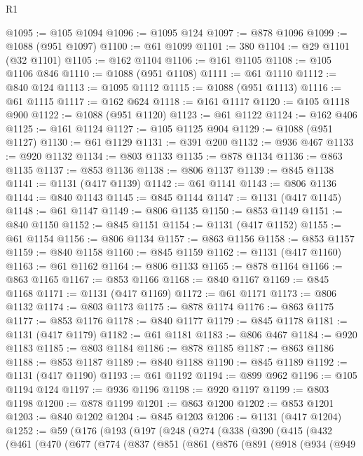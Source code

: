 \begin{lexlean}{R1}
\begin{coremodule}
@1095 := @105 @1094
@1096 := @1095 @124
@1097 := @878 @1096
@1099 := @1088 (@951 @1097)
@1100 := @61 @1099
@1101 := 380
@1104 := @29 @1101 (@32 @1101)
@1105 := @162 @1104
@1106 := @161 @1105
@1108 := @105 @1106 @846
@1110 := @1088 (@951 @1108)
@1111 := @61 @1110
@1112 := @840 @124
@1113 := @1095 @1112
@1115 := @1088 (@951 @1113)
@1116 := @61 @1115
@1117 := @162 @624
@1118 := @161 @1117
@1120 := @105 @1118 @900
@1122 := @1088 (@951 @1120)
@1123 := @61 @1122
@1124 := @162 @406
@1125 := @161 @1124
@1127 := @105 @1125 @904
@1129 := @1088 (@951 @1127)
@1130 := @61 @1129
@1131 := @391 @200
@1132 := @936 @467
@1133 := @920 @1132
@1134 := @803 @1133
@1135 := @878 @1134
@1136 := @863 @1135
@1137 := @853 @1136
@1138 := @806 @1137
@1139 := @845 @1138
@1141 := @1131 (@417 @1139)
@1142 := @61 @1141
@1143 := @806 @1136
@1144 := @840 @1143
@1145 := @845 @1144
@1147 := @1131 (@417 @1145)
@1148 := @61 @1147
@1149 := @806 @1135
@1150 := @853 @1149
@1151 := @840 @1150
@1152 := @845 @1151
@1154 := @1131 (@417 @1152)
@1155 := @61 @1154
@1156 := @806 @1134
@1157 := @863 @1156
@1158 := @853 @1157
@1159 := @840 @1158
@1160 := @845 @1159
@1162 := @1131 (@417 @1160)
@1163 := @61 @1162
@1164 := @806 @1133
@1165 := @878 @1164
@1166 := @863 @1165
@1167 := @853 @1166
@1168 := @840 @1167
@1169 := @845 @1168
@1171 := @1131 (@417 @1169)
@1172 := @61 @1171
@1173 := @806 @1132
@1174 := @803 @1173
@1175 := @878 @1174
@1176 := @863 @1175
@1177 := @853 @1176
@1178 := @840 @1177
@1179 := @845 @1178
@1181 := @1131 (@417 @1179)
@1182 := @61 @1181
@1183 := @806 @467
@1184 := @920 @1183
@1185 := @803 @1184
@1186 := @878 @1185
@1187 := @863 @1186
@1188 := @853 @1187
@1189 := @840 @1188
@1190 := @845 @1189
@1192 := @1131 (@417 @1190)
@1193 := @61 @1192
@1194 := @899 @962
@1196 := @105 @1194 @124
@1197 := @936 @1196
@1198 := @920 @1197
@1199 := @803 @1198
@1200 := @878 @1199
@1201 := @863 @1200
@1202 := @853 @1201
@1203 := @840 @1202
@1204 := @845 @1203
@1206 := @1131 (@417 @1204)
@1252 := @59
    (@176
      (@193
        (@197
          (@248
            (@274
              (@338
                (@390
                  (@415
                    (@432
                      (@461
                        (@470
                          (@677
                            (@774
                              (@837
                                (@851
                                  (@861
                                    (@876
                                      (@891
                                        (@918
                                          (@934
                                            (@949

\end{coremodule}
\end{lexlean}
